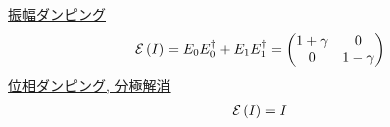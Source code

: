 \begin{ex}
    \label{ex8.28}

\end{ex}

\begin{ex}
    \label{ex8.29}
    \underline{振幅ダンピング}
    \begin{align*}
        \mathcal{E} \left( I \right)
        =
        E_0 E_0^\dagger + E_1 E_1^\dagger
        =
        \begin{pmatrix}
            1 + \gamma & 0          \\
            0          & 1 - \gamma
        \end{pmatrix}
    \end{align*}
    \underline{位相ダンピング, 分極解消}
    \begin{align*}
        \mathcal{E} \left( I \right)
        = I
    \end{align*}
\end{ex}

